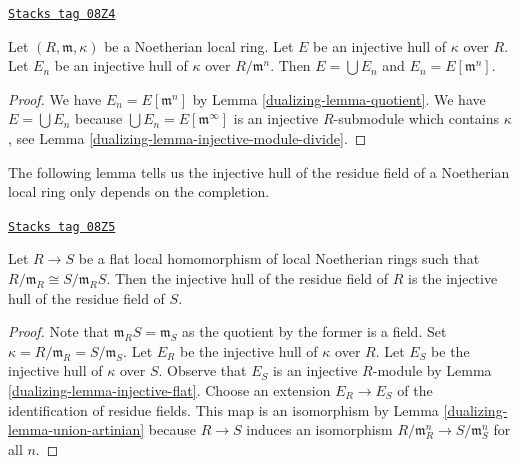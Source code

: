 \begin{lemma}
\label{dualizing-lemma-union-artinian}
\href{https://stacks.math.columbia.edu/tag/08Z4}{\texttt{Stacks tag 08Z4}}

Let $(R, \mathfrak m, \kappa)$ be a Noetherian local ring.
Let $E$ be an injective hull of $\kappa$ over $R$.
Let $E_n$ be an injective hull of $\kappa$ over $R/\mathfrak m^n$.
Then $E = \bigcup E_n$ and $E_n = E[\mathfrak m^n]$.
\end{lemma}

\begin{proof}

We have $E_n = E[\mathfrak m^n]$ by Lemma \ref{dualizing-lemma-quotient}.
We have $E = \bigcup E_n$ because $\bigcup E_n = E[\mathfrak m^\infty]$
is an injective $R$-submodule which contains $\kappa$, see
Lemma \ref{dualizing-lemma-injective-module-divide}.
\end{proof}

The following lemma tells us the injective hull of the residue
field of a Noetherian local ring only depends on the completion.

\begin{lemma}[Compare]
\label{dualizing-lemma-compare}
\href{https://stacks.math.columbia.edu/tag/08Z5}{\texttt{Stacks tag 08Z5}}

Let $R \to S$ be a flat local homomorphism of local Noetherian rings
such that $R/\mathfrak m_R \cong S/\mathfrak m_R S$.
Then the injective hull of the residue field
of $R$ is the injective hull of the residue field of $S$.
\end{lemma}

\begin{proof}

Note that $\mathfrak m_RS = \mathfrak m_S$ as the quotient by the former
is a field. Set $\kappa = R/\mathfrak m_R = S/\mathfrak m_S$.
Let $E_R$ be the injective hull of $\kappa$ over $R$.
Let $E_S$ be the injective hull of $\kappa$ over $S$.
Observe that $E_S$ is an injective $R$-module by
Lemma \ref{dualizing-lemma-injective-flat}.
Choose an extension $E_R \to E_S$ of the identification of
residue fields. This map is an isomorphism by
Lemma \ref{dualizing-lemma-union-artinian}
because $R \to S$ induces an isomorphism
$R/\mathfrak m_R^n \to S/\mathfrak m_S^n$ for all $n$.
\end{proof}

